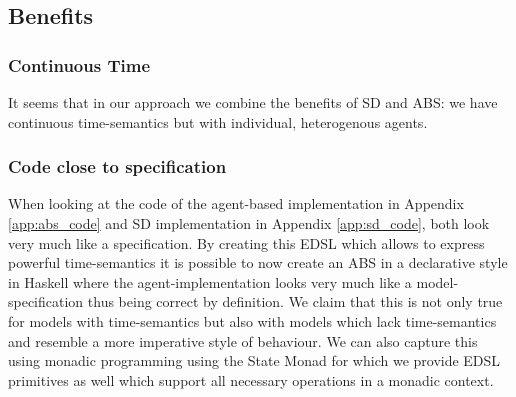 \subsection{Benefits}

\subsubsection{Continuous Time}
It seems that in our approach we combine the benefits of SD and ABS: we have continuous time-semantics but with individual, heterogenous agents.

\subsubsection{Code close to specification}
When looking at the code of the agent-based implementation in Appendix \ref{app:abs_code} and SD implementation in Appendix \ref{app:sd_code}, both look very much like a specification. By creating this EDSL which allows to express powerful time-semantics it is possible to now create an ABS in a declarative style in Haskell where the agent-implementation looks very much like a model-specification thus being correct by definition.
We claim that this is not only true for models with time-semantics but also with models which lack time-semantics and resemble a more imperative style of behaviour. We can also capture this using monadic programming using the State Monad for which we provide EDSL primitives as well which support all necessary operations in a monadic context.


